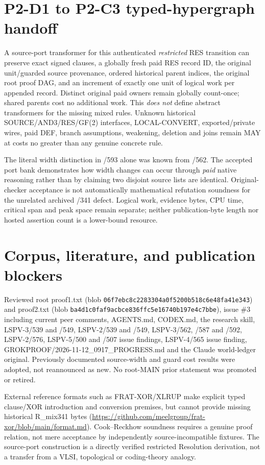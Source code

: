 \documentclass[11pt]{article}
\begin{document}
\section*{P2-D1 to P2-C3 typed-hypergraph handoff}
A source-port transformer for this authenticated \emph{restricted}
RES transition can preserve exact signed clauses, a globally
fresh paid RES record ID, the original unit/guarded source
provenance, ordered historical parent indices, the original
root proof DAG, and an increment of exactly one unit of
logical work per appended record. Distinct original paid owners
remain globally count-once; shared parents cost no additional
work. This \emph{does not} define abstract transformers for
the missing mixed rules. Unknown historical SOURCE/AND3/RES/GF(2)
interfaces, LOCAL-CONVERT, exported/private wires, paid DEF,
branch assumptions, weakening, deletion and joins remain MAY
at costs no greater than any genuine concrete rule.

\noindent The literal width distinction in /593 alone was known
from /562. The accepted port bank demonstrates how width changes
can occur through \emph{paid} native reasoning rather than by
claiming two disjoint source lists are identical.
Original-checker acceptance is not automatically mathematical
refutation soundness for the unrelated archived /341 defect.
Logical work, evidence bytes, CPU time, critical span and peak
space remain separate; neither publication-byte length nor
hosted assertion count is a lower-bound resource.

\section*{Corpus, literature, and publication blockers}
Reviewed root proof1.txt (blob
\texttt{06f7ebc8c2283304a0f5200b518c6e48fa41e343})
and proof2.txt (blob
\texttt{ba4d1c0faf9acbce836ffc5e16740b197e4c7bbe}),
issue \#3 including current peer comments, AGENTS.md, CODEX.md,
the research skill, LSPV-3/539 and /549, LSPV-2/539 and /549,
LSPV-3/562, /587 and /592, LSPV-2/576,
LSPV-5/500 and /507 issue findings, LSPV-4/565 issue finding,
GROKPROOF/2026-11-12\_0917\_PROGRESS.md and the
Claude world-ledger original. Previously documented source-width
and guard cost results were adopted, not reannounced as new.
No root-MAIN prior statement was promoted or retired.

External reference formats such as FRAT-XOR/XLRUP make explicit
typed clause/XOR introduction and conversion premises, but
cannot provide missing historical R_mix341 bytes
(\url{https://github.com/meelgroup/frat-xor/blob/main/format.md}).
Cook--Reckhow soundness requires a genuine proof relation,
not mere acceptance by independently source-incompatible fixtures.
The source-port construction is a directly verified restricted
Resolution derivation, not a transfer from a VLSI, topological or
coding-theory analogy.
\end{document}
